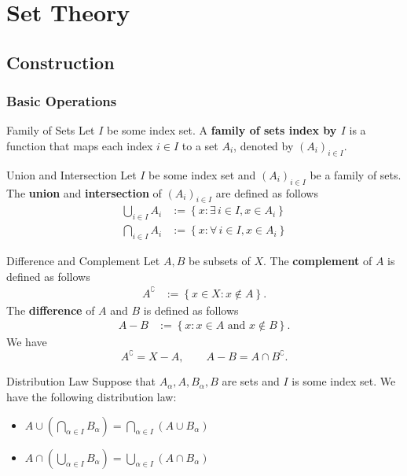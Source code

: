 
\chapter{Set Theory}
\thispagestyle{empty}
\setcounter{page}{1}


\section{Construction}
\subsection{Basic Operations}
\begin{definition}{Family of Sets}{}
    Let $I$ be some index set. A \textbf{family of sets index by $I$} is a function that maps each index $i\in I$ to a set $A_i$, denoted by $\left(A_i\right)_{i\in I}$.
\end{definition}

\begin{definition}{Union and Intersection}{}
    Let $I$ be some index set and $(A_i)_{i\in I}$ be a family of sets. The \textbf{union} and \textbf{intersection} of $(A_i)_{i\in I}$ are defined as follows
	\begin{align*}
		\bigcup_{i\in I} A_i&:=\left\{x:\exists\,i\in I,x\in A_i \right\}\\
		\bigcap_{i\in I} A_i&:=\left\{x:\forall\,i\in I,x\in A_i \right\}
	\end{align*}
\end{definition}

\begin{definition}{Difference and Complement}{}
    Let $A,B$ be subsets of $X$. The \textbf{complement} of $A$ is defined as follows
    \begin{align*}
        A^{\complement}&:=\left\{x\in X:x\notin A \right\}.
    \end{align*}
    The \textbf{difference} of $A$ and $B$ is defined as follows 
    \begin{align*}
        A-B&:=\left\{x:x\in A\text{ and }x\notin B \right\}.
    \end{align*}
    We have
    \[
        A^{\complement}=X-A,\qquad A-B   =A\cap B^{\complement}.
    \]
\end{definition}

\begin{proposition}{Distribution Law}{}
	Suppose that $A_\alpha,A,B_\alpha,B$ are sets and $I$ is some index set. We have the following distribution law:
	\begin{itemize}
        \item $A\cup\left(\bigcap\limits_{\alpha\in I}B_\alpha\right)=\bigcap\limits_{\alpha\in I}\left(A\cup B_\alpha\right)$
		\item $A\cap\left(\bigcup\limits_{\alpha\in I}B_\alpha\right)=\bigcup\limits_{\alpha\in I}\left(A\cap B_\alpha\right)$
	\end{itemize}
\end{proposition}


